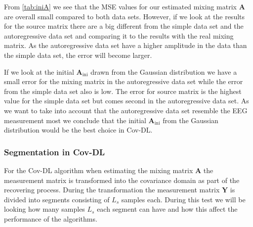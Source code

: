 \noindent
From \ref{tab:iniA} we see that the MSE values for our estimated mixing matrix $\mathbf{A}$ are overall small compared to both data sets. However, if we look at the results for the source matrix there are a big different from the simple data set and the autoregressive data set and comparing it to the results with the real mixing matrix. 
As the autoregressive data set have a higher amplitude in the data than the simple data set, the error will become larger. 

If we look at the initial $\mathbf{A}_{\text{ini}}$ drawn from the Gaussian distribution we have a small error for the mixing matrix in the autoregressive data set while the error from the simple data set also is low. The error for source matrix is the highest value for the simple data set but comes second in the autoregressive data set. As we want to take into account that the autoregressive data set resemble the EEG measurement most we conclude that the initial $\mathbf{A}_{\text{ini}}$ from the Gaussian distribution would be the best choice in Cov-DL.

\subsubsection{Segmentation in Cov-DL}
For the Cov-DL algorithm when estimating the mixing matrix $\mathbf{A}$ the measurement matrix is transformed into the covariance domain as part of the recovering process. During the transformation the measurement matrix $\mathbf{Y}$ is divided into segments consisting of $L_s$ samples each.
During this test we will be looking how many samples $L_s$ each segment can have and how this affect the performance of the algorithms.

